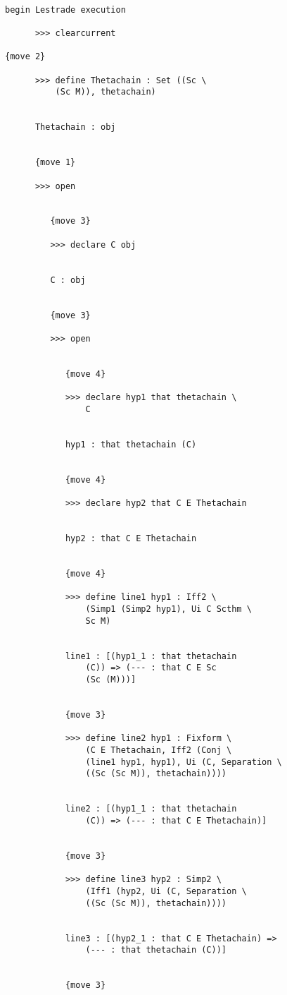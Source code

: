 \documentclass[12pt]{article}
\begin{document}
\begin{verbatim}

begin Lestrade execution

      >>> clearcurrent

{move 2}

      >>> define Thetachain : Set ((Sc \
          (Sc M)), thetachain)


      Thetachain : obj


      {move 1}

      >>> open


         {move 3}

         >>> declare C obj


         C : obj


         {move 3}

         >>> open


            {move 4}

            >>> declare hyp1 that thetachain \
                C


            hyp1 : that thetachain (C)


            {move 4}

            >>> declare hyp2 that C E Thetachain


            hyp2 : that C E Thetachain


            {move 4}

            >>> define line1 hyp1 : Iff2 \
                (Simp1 (Simp2 hyp1), Ui C Scthm \
                Sc M)


            line1 : [(hyp1_1 : that thetachain 
                (C)) => (--- : that C E Sc 
                (Sc (M)))]


            {move 3}

            >>> define line2 hyp1 : Fixform \
                (C E Thetachain, Iff2 (Conj \
                (line1 hyp1, hyp1), Ui (C, Separation \
                ((Sc (Sc M)), thetachain))))


            line2 : [(hyp1_1 : that thetachain 
                (C)) => (--- : that C E Thetachain)]


            {move 3}

            >>> define line3 hyp2 : Simp2 \
                (Iff1 (hyp2, Ui (C, Separation \
                ((Sc (Sc M)), thetachain))))


            line3 : [(hyp2_1 : that C E Thetachain) => 
                (--- : that thetachain (C))]


            {move 3}


\end{verbatim}
\end{document}

